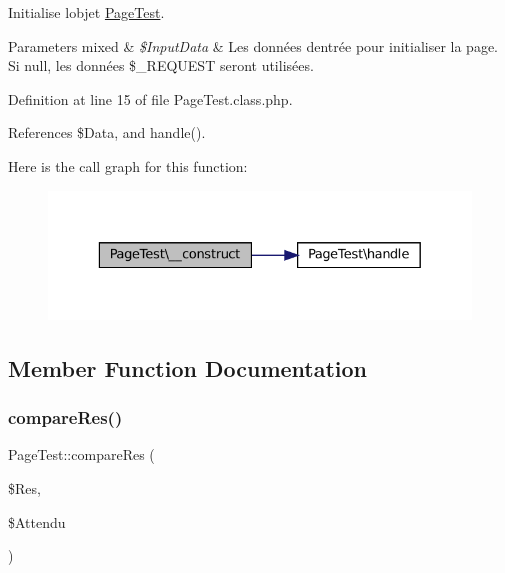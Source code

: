 Initialise l\textquotesingle{}objet \hyperlink{class_page_test}{Page\+Test}.


\begin{DoxyParams}[1]{Parameters}
mixed & {\em \$\+Input\+Data} & Les données d\textquotesingle{}entrée pour initialiser la page. Si null, les données \$\+\_\+\+R\+E\+Q\+U\+E\+ST seront utilisées. \\
\hline
\end{DoxyParams}


Definition at line 15 of file Page\+Test.\+class.\+php.



References \$\+Data, and handle().

Here is the call graph for this function\+:\nopagebreak
\begin{figure}[H]
\begin{center}
\leavevmode
\includegraphics[width=329pt]{class_page_test_a808f30b68701ec7ae61f5b8cde69915b_cgraph}
\end{center}
\end{figure}


\subsection{Member Function Documentation}
\mbox{\label{class_page_test_a4d3c2315c1baf52ee8e5f6eec04f3818}} 
\subsubsection{\texorpdfstring{compare\+Res()}{compareRes()}}
{\footnotesize\ttfamily Page\+Test\+::compare\+Res (\begin{DoxyParamCaption}\item[{}]{\$\+Res,  }\item[{}]{\$\+Attendu }\end{DoxyParamCaption})\hspace{0.3cm}{\ttfamily [protected]}}

